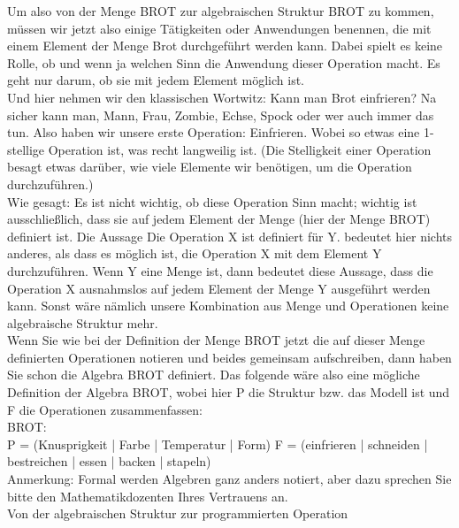 Um also von der Menge BROT zur algebraischen Struktur BROT zu kommen, müssen wir jetzt also einige Tätigkeiten oder Anwendungen benennen, die mit einem Element der Menge Brot durchgeführt werden kann. Dabei spielt es keine Rolle, ob und wenn ja welchen Sinn die Anwendung dieser Operation macht. Es geht nur darum, ob sie mit jedem Element möglich ist.\\

Und hier nehmen wir den klassischen Wortwitz: Kann man Brot einfrieren? Na sicher kann man, Mann, Frau, Zombie, Echse, Spock oder wer auch immer das tun. Also haben wir unsere erste Operation: Einfrieren. Wobei so etwas eine 1-stellige Operation ist, was recht langweilig ist. (Die Stelligkeit einer Operation besagt etwas darüber, wie viele Elemente wir benötigen, um die Operation durchzuführen.)\\

Wie gesagt: Es ist nicht wichtig, ob diese Operation Sinn macht; wichtig ist ausschließlich, dass sie auf jedem Element der Menge (hier der Menge BROT) definiert ist. Die Aussage \glqq{}Die Operation X ist definiert für Y.\grqq{} bedeutet hier nichts anderes, als dass es möglich ist, die Operation X mit dem Element Y durchzuführen. Wenn Y eine Menge ist, dann bedeutet diese Aussage, dass die Operation X ausnahmslos auf jedem Element der Menge Y ausgeführt werden kann. Sonst wäre nämlich unsere Kombination aus Menge und Operationen keine algebraische Struktur mehr.\\

Wenn Sie wie bei der Definition der Menge BROT jetzt die auf dieser Menge definierten Operationen notieren und beides gemeinsam aufschreiben, dann haben Sie schon die Algebra BROT definiert. Das folgende wäre also eine mögliche Definition der Algebra BROT, wobei hier P die Struktur bzw. das Modell ist und F die Operationen zusammenfassen:\\

BROT: \\

P = (Knusprigkeit | Farbe | Temperatur | Form)
F = (einfrieren | schneiden | bestreichen | essen | backen | stapeln)\\

Anmerkung: Formal werden Algebren ganz anders notiert, aber dazu sprechen Sie bitte den Mathematikdozenten Ihres Vertrauens an.\\

Von der algebraischen Struktur zur programmierten Operation\\

